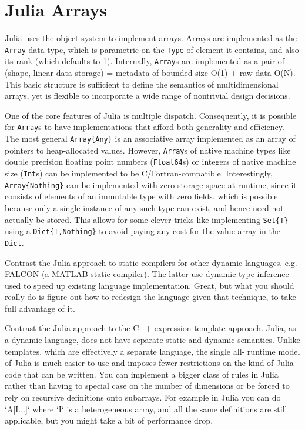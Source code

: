 \documentclass[preprint]{sigplanconf}
\newcommand{\MATLAB}{\textsc{MATLAB}}
\newcommand{\code}[1]{\texttt{#1}}
\begin{document}
\section{Julia Arrays}

Julia uses the object system to implement arrays. Arrays are implemented as
the \code{Array} data type, which is parametric on the \code{Type} of element
it contains, and also its rank (which defaults to 1). Internally,
\code{Array}s are implemented as a pair of (shape, linear data storage) =
metadata of bounded size O(1) + raw data O(N). This basic structure is
sufficient to define the semantics of multidimensional arrays, yet is flexible
to incorporate a wide range of nontrivial design decisions.

One of the core features of Julia is multiple dispatch. Consequently, it is
possible for \code{Array}s to have implementations that afford both generality
and efficiency. The most general \code{Array\{Any\}} is an associative array
implemented as an array of pointers to heap-allocated values. However,
\code{Array}s of native machine types like double precision floating point
numbers (\code{Float64}s) or integers of native machine size (\code{Int}s) can
be implemented to be C/Fortran-compatible. Interestingly,
\code{Array\{Nothing\}} can be implemented with zero storage space at runtime,
since it consists of elements of an immutable type with zero fields, which is
possible because only a single instance of any such type can exist, and hence
need not actually be stored. This allows for some clever tricks like
implementing \code{Set\{T\}} using a \code{Dict\{T,Nothing\}} to avoid paying
any cost for the value array in the \code{Dict}.

Contrast the Julia approach to static compilers for other dynamic languages,
e.g. FALCON (a \MATLAB{} static compiler). The latter use dynamic type
inference used to speed up existing language implementation. Great, but what
you should really do is figure out how to redesign the language given that
technique, to take full advantage of it.

Contrast the Julia approach to the C++ expression template approach. Julia, as
a dynamic language, does not have separate static and dynamic semantics.
Unlike templates, which are effectively a separate language, the single all-
runtime model of Julia is much easier to use and imposes fewer restrictions on
the kind of Julia code that can be written. You can implement a bigger class
of rules in Julia rather than having to special case on the number of
dimensions or be forced to rely on recursive definitions onto subarrays. For
example in Julia you can do `A[I...]` where `I` is a heterogeneous array, and
all the same definitions are still applicable, but you might take a bit of
performance drop.
\end{document}
